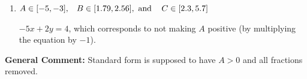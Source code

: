 \documentclass{extbook}[14pt]
\begin{document}
\begin{enumerate}
{\begin{enumerate}[label=\Alph*.]
* $5x - 2y = -4$, which is the correct option.
\item \( A \in [-5, -3], \hspace{3mm} B \in [1.79, 2.56], \text{ and } \hspace{3mm} C \in [2.3, 5.7] \)

 $-5x + 2y = 4$, which corresponds to not making $A$ positive (by multiplying the equation by $-1$).
\end{enumerate}

\textbf{General Comment:} Standard form is supposed to have $A > 0$ and all fractions removed.
}
\end{enumerate}
\end{document}
